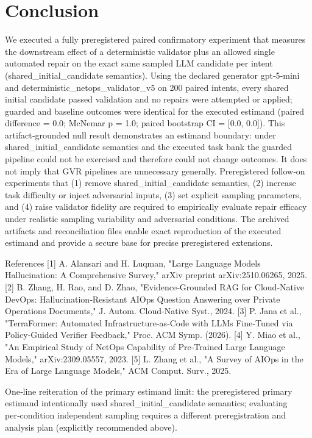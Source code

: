 \documentclass[conference]{IEEEtran}
\begin{document}
\section{Conclusion}
We executed a fully preregistered paired confirmatory experiment that measures the downstream effect of a deterministic validator plus an allowed single automated repair on the exact same sampled LLM candidate per intent (shared\_initial\_candidate semantics). Using the declared generator gpt‑5‑mini and deterministic\_netops\_validator\_v5 on 200 paired intents, every shared initial candidate passed validation and no repairs were attempted or applied; guarded and baseline outcomes were identical for the executed estimand (paired difference = 0.0; McNemar p = 1.0; paired bootstrap CI = [0.0, 0.0]). This artifact‑grounded null result demonstrates an estimand boundary: under shared\_initial\_candidate semantics and the executed task bank the guarded pipeline could not be exercised and therefore could not change outcomes. It does not imply that GVR pipelines are unnecessary generally. Preregistered follow‑on experiments that (1) remove shared\_initial\_candidate semantics, (2) increase task difficulty or inject adversarial inputs, (3) set explicit sampling parameters, and (4) raise validator fidelity are required to empirically evaluate repair efficacy under realistic sampling variability and adversarial conditions. The archived artifacts and reconciliation files enable exact reproduction of the executed estimand and provide a secure base for precise preregistered extensions.

References
[1] A. Alansari and H. Luqman, "Large Language Models Hallucination: A Comprehensive Survey," arXiv preprint arXiv:2510.06265, 2025.
[2] B. Zhang, H. Rao, and D. Zhao, "Evidence‑Grounded RAG for Cloud‑Native DevOps: Hallucination‑Resistant AIOps Question Answering over Private Operations Documents," J. Autom. Cloud‑Native Syst., 2024.
[3] P. Jana et al., "TerraFormer: Automated Infrastructure‑as‑Code with LLMs Fine‑Tuned via Policy‑Guided Verifier Feedback," Proc. ACM Symp. (2026).
[4] Y. Miao et al., "An Empirical Study of NetOps Capability of Pre‑Trained Large Language Models," arXiv:2309.05557, 2023.
[5] L. Zhang et al., "A Survey of AIOps in the Era of Large Language Models," ACM Comput. Surv., 2025.

One‑line reiteration of the primary estimand limit: the preregistered primary estimand intentionally used shared\_initial\_candidate semantics; evaluating per‑condition independent sampling requires a different preregistration and analysis plan (explicitly recommended above).
\end{document}
